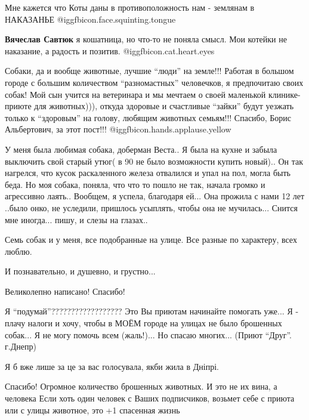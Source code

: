 \begin{itemize}
Мне кажется что Коты даны в противоположность нам - землянам в НАКАЗАНЬЕ
@igg{fbicon.face.squinting.tongue} 

\begin{itemize} %
\textbf{Вячеслав Савтюк} я кошатница, но что-то не поняла смысл. Мои котейки не наказание, а радость и позитив. 
@igg{fbicon.cat.heart.eyes} 
\end{itemize} %


Собаки, да и вообще животные, лучшие \enquote{люди} на земле!!! Работая в большом
городе с большим количеством \enquote{разномастных} человечков, я предпочитаю своих
собак! Мой сын учится на ветеринара и мы мечтаем о своей маленькой
клинике-приюте для животных))), откуда здоровые и счастливые \enquote{зайки} будут
уезжать только к \enquote{здоровым} на голову, любящим животных семьям!!! Спасибо,
Борис Альбертович, за этот пост!!!  @igg{fbicon.hands.applause.yellow} 


У меня была любимая собака, доберман Веста.. Я была на кухне и забыла выключить
свой старый утюг( в 90 не было возможности купить новый).. Он так нагрелся, что
кусок раскаленного железа отвалился и упал на пол, могла быть беда. Но моя
собака, поняла, что что то пошло не так, начала громко и агрессивно
лаять.. Вообщем, я успела, благодаря ей... Она прожила с нами 12 лет ..было
онко, не уследили, пришлось усыплять, чтобы она не мучилась... Снится мне
иногда... пишу, и слезы на глазах..

Семь собак и у меня, все подобранные на улице. Все разные по характеру, всех люблю.

И познавательно, и душевно, и грустно...

Великолепно написано! Спасибо!


Я \enquote{подумай}?????????????????? Это Вы приютам начинайте помогать уже... Я -
плачу налоги и хочу, чтобы в МОЁМ городе на улицах не было брошенных собак... Я
не могу помочь всем (жаль!)... Но спасаю многих... (Приют \enquote{Друг}. г.Днепр)

Я б вже лише за це за вас голосувала, якби жила в Дніпрі.

Спасибо! Огромное количество брошенных животных. И это не их вина, а человека
Если хоть один человек с Ваших подписчиков, возьмет себе с приюта или с улицы животное, это +1 спасенная жизнь


\end{itemize}
